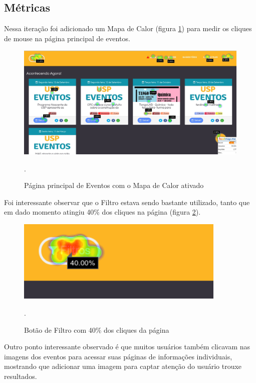 \subsection{Métricas}

\par Nessa iteração foi adicionado um Mapa de Calor (figura \ref{fig:heatmap}) para medir os cliques de mouse na página principal de eventos.
\begin{figure}[htb]
\centering
\includegraphics[width=15cm]{figuras/heatmap}
\caption{\label{fig:heatmap} Página principal de Eventos com o Mapa de Calor ativado}.
\end{figure}

\par Foi interessante observar que o Filtro estava sendo bastante utilizado, tanto que em dado momento atingiu 40\% dos cliques na página (figura \ref{fig:heatmap_filter}).
\begin{figure}[htb]
\centering
\includegraphics[width=10cm]{figuras/heatmap_filter}
\caption{\label{fig:heatmap_filter} Botão de Filtro com 40\% dos cliques da página}.
\end{figure}

\par Outro ponto interessante observado é que muitos usuários também clicavam nas imagens dos eventos para acessar suas páginas de informações individuais, mostrando que adicionar uma imagem para captar atenção do usuário trouxe resultados.

